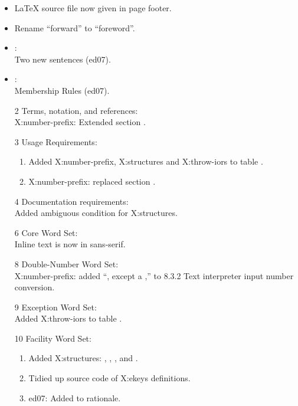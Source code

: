 	\begin{itemize}
	\item \LaTeX{} source file now given in page footer.

	\item Rename ``forward'' to ``foreword''.

	\item {}: \\
		Two new sentences (\textsf{ed07}).

	\item {}: \\
		Membership Rules (\textsf{ed07}).

	\item[2] Terms, notation, and references: \\
		\textsf{X:number-prefix}: Extended section
		.

	\item[3] Usage Requirements:
		\begin{enumerate}
		\item Added \textsf{X:number-prefix}, \textsf{X:structures}
			and \textsf{X:throw-iors} to table .
		\item \textsf{X:number-prefix}: replaced section
			.
		\end{enumerate}

	\item[4] Documentation requirements: \\
		Added ambiguous condition for \textsf{X:structures}.

	\item[6] Core Word Set: \\
		Inline text is now in sans-serif.

	\item[8] Double-Number Word Set: \\
		\textsf{X:number-prefix}: added ``, except a ,''
		to 8.3.2 Text interpreter input number conversion.

	\item[9] Exception Word Set: \\
		Added \textsf{X:throw-iors} to table .

	\item[10] Facility Word Set:
		\begin{enumerate}
		\item Added \textsf{X:structures}:
			,
			, \linebreak
			,
			 and
			.
		\item Tidied up source code of \textsf{X:ekeys} definitions.
		\item \textsf{ed07}: Added to  rationale.
		\end{enumerate}


\end{itemize}
